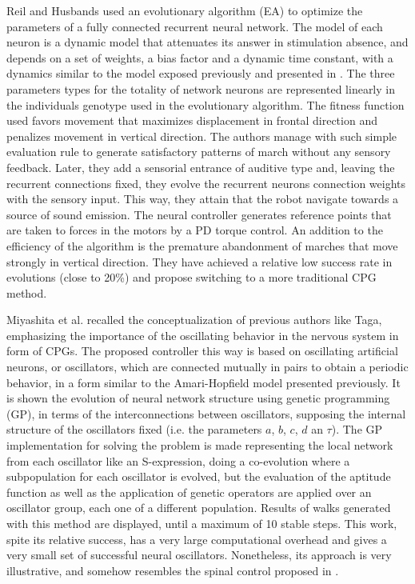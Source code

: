Reil and Husbands \cite{Reil02Evolution} used an evolutionary
algorithm (EA) to optimize the parameters of a fully connected
recurrent neural network. The model of each neuron is a dynamic model
that attenuates its answer in stimulation absence, and depends on a
set of weights, a bias factor and a dynamic time constant, with a
dynamics similar to the model exposed previously and presented in
\cite{Cao98design}. The three parameters types for the totality of
network neurons are represented linearly in the individuals genotype
used in the evolutionary algorithm. The fitness function used favors
movement that maximizes displacement in frontal direction and
penalizes movement in vertical direction. The authors manage with such
simple evaluation rule to generate satisfactory patterns of march
without any sensory feedback. Later, they add a sensorial entrance of
auditive type and, leaving the recurrent connections fixed, they
evolve the recurrent neurons connection weights with the sensory
input. This way, they attain that the robot navigate towards a source
of sound emission. The neural controller generates reference points
that are taken to forces in the motors by a PD torque control. An
addition to the efficiency of the algorithm is the premature
abandonment of marches that move strongly in vertical direction. They
have achieved a relative low success rate in evolutions (close to
20\%) and propose switching to a more traditional CPG method.


Miyashita et al. \cite{Miyashita03Evolutionary} recalled the
conceptualization of previous authors like Taga, emphasizing the
importance of the oscillating behavior in the nervous system in form
of CPGs. The proposed controller this way is based on oscillating
artificial neurons, or oscillators, which are connected mutually in
pairs to obtain a periodic behavior, in a form similar to the
Amari-Hopfield model presented previously. It is shown the evolution
of neural network structure using genetic programming (GP), in terms
of the interconnections between oscillators, supposing the internal
structure of the oscillators fixed (i.e. the parameters $a$, $b$, $c$,
$d$ an $\tau$). The GP implementation for solving the problem is made
representing the local network from each oscillator like an
S-expression, doing a co-evolution where a subpopulation for each
oscillator is evolved, but the evaluation of the aptitude function as
well as the application of genetic operators are applied over an
oscillator group, each one of a different population. Results of walks
generated with this method are displayed, until a maximum of 10 stable
steps. This work, spite its relative success, has a very large
computational overhead and gives a very small set of successful neural
oscillators. Nonetheless, its approach is very illustrative, and
somehow resembles the spinal control proposed in
\cite{Duysens02walking}.


